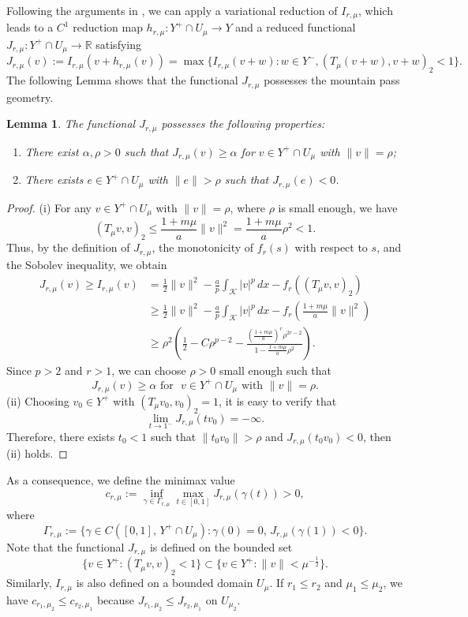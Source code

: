 \documentclass[11pt]{amsart}
\newtheorem{lemma}[theorem]{Lemma}
\newcommand{\norm}[1]{\lVert#1\rVert}
\newcommand{\K}{\mathcal{K}}
\numberwithin{equation}{section}
\begin{document}
Following the arguments in \cite[Section 2.3]{Ding}, we can apply a variational reduction of $I_{r, \mu}$, which leads to a $C^1$ reduction map $h_{r, \mu}: Y^{+} \cap U_{\mu} \rightarrow Y$ and a reduced functional $J_{r, \mu}: Y^{+} \cap U_{\mu} \rightarrow \mathbb{R}$ satisfying
\begin{equation*}
J_{r, \mu}(v) := I_{r, \mu}(v+h_{r, \mu}(v))=\max \{I_{r, \mu}(v+w): w \in Y^{-},(T_{\mu}(v+w), v+w)_{2}<1\}.
\end{equation*}
The following Lemma shows that the functional $J_{r, \mu}$ possesses the mountain pass geometry.
\begin{lemma}
The functional $J_{r, \mu}$ possesses the following properties:
  \begin{enumerate}[label=\rm(\roman*)]
\item There exist $\alpha, \rho>0$ such that $J_{r, \mu}(v) \geq \alpha$ for $v \in Y^{+} \cap U_{\mu}$ with $\|v\|=\rho$;
\item There exists  $e \in Y^{+} \cap U_{\mu}$ with $\|e\|>\rho$ such that $J_{r, \mu}(e)<0$.
\end{enumerate}
\end{lemma}
\begin{proof}
(i) For any $v \in Y^{+} \cap U_{\mu}$ with $\|v\|=\rho$, where $\rho$ is small enough, we have
$$
(T_{\mu} v, v)_{2} \leq \frac{1+m \mu}{a}\|v\|^{2}=\frac{1+m \mu}{a} \rho^{2}<1.
$$
Thus, by the definition of $J_{r, \mu}$, the monotonicity of $f_{r}(s)$ with respect to $s$, and the Sobolev inequality, we obtain
$$
\begin{aligned}
J_{r, \mu}(v) \geq I_{r, \mu}(v) & =\frac{1}{2}\|v\|^{2}-\frac{a}{p} \int_{\K}|v|^{p}\,dx-f_{r}((T_{\mu} v, v)_{2}) \\
& \geq \frac{1}{2}\|v\|^{2}-\frac{a}{p} \int_{\K}|v|^{p} \,dx-f_{r}\left(\frac{1+m \mu}{a}\|v\|^{2}\right) \\
& \geq \rho^{2}\left(\frac{1}{2}-C \rho^{p-2}-\frac{(\frac{1+m \mu}{a})^{r} \rho^{2 r-2}}{1-\frac{1+m \mu}{a} \rho^{2}}\right).
\end{aligned}
$$
Since $p>2$ and $r>1$,  we can choose $\rho>0$ small enough such that
$$
J_{r, \mu}(v) \geq \alpha \,\,\text {for }\,\, v \in Y^{+} \cap U_{\mu} \text { with }\|v\|=\rho.
$$
(ii) Choosing $v_{0} \in Y^{+}$ with $(T_{\mu} v_{0}, v_{0})_{2}=1$, it is easy to verify that
$$
\lim _{t \rightarrow 1^{-}} J_{r, \mu}(t v_{0})=-\infty.
$$
Therefore, there exists $t_{0}<1$ such that $\norm{t_{0} v_{0}}>\rho$ and $J_{r, \mu}(t_{0} v_{0})<0$, then (ii) holds.
\end{proof}
As a consequence, we define the minimax value
$$
c_{r, \mu}:=\inf _{\gamma \in \Gamma_{r, \mu}} \max _{t \in[0,1]} J_{r, \mu}(\gamma(t))>0,
$$
where
$$
\Gamma_{r, \mu} := \{\gamma \in C([0,1],\, Y^{+} \cap U_{\mu}): \gamma(0)=0,\, J_{r, \mu}(\gamma(1))<0\}.
$$
Note that the functional $J_{r, \mu}$ is defined on the bounded set
$$
\{v \in Y^{+}:(T_{\mu} v, v)_{2}<1\} \subset\{v \in Y^{+}:\|v\|<\mu^{-\frac{1}{2}}\}.
$$
Similarly, $I_{r, \mu}$ is also defined on a bounded domain $U_{\mu}$. If $r_{1} \leq r_{2}$ and $\mu_{1} \leq \mu_{2}$, we have $c_{r_{1}, \mu_{2}} \leq c_{r_{2}, \mu_{1}}$ because $J_{r_{1}, \mu_{2}} \leq J_{r_{2}, \mu_{1}}$ on $U_{\mu_{2}}$.
\end{document}
